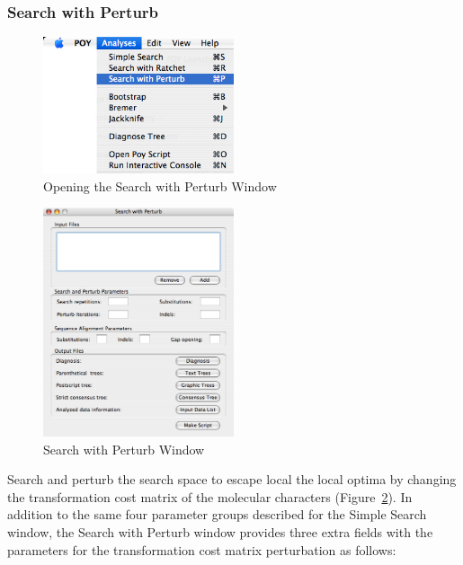 \subsubsection{Search with Perturb}


\begin{figure}[htpb]
    \begin{center}
        \includegraphics[width=0.5\textwidth]{figures/SearchWithPerturb_Menu.jpg}
    \end{center}
    \caption{Opening the Search with Perturb Window}
    \label{fig:search_with_perturb_menu}
\end{figure}

\begin{figure}[htpb]
    \begin{center}
        \includegraphics[width=0.5\textwidth]{figures/SearchWithPerturb_Window.jpg}
    \end{center}
    \caption{Search with Perturb Window}
    \label{fig:search_with_perturb_window}
\end{figure}

Search and perturb the search space to escape local the local optima by changing
the transformation cost matrix of the molecular characters
(Figure~\ref{fig:search_with_perturb_window}). In addition to the
same four parameter groups described for the Simple Search window, the Search
with Perturb window provides three extra fields with the parameters for the
transformation cost matrix perturbation as follows:

